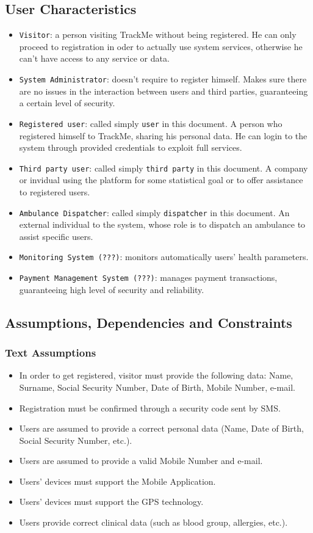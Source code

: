\documentclass[12pt,a4paper]{article}
\begin{document}
		\subsection{User Characteristics}
			\begin{itemize}
				\item \texttt{Visitor}: a person visiting TrackMe without being registered. He can only proceed to registration in oder to actually use system services, otherwise he can't have access to any service or data.
				\item \texttt{System Administrator}: doesn't require to register himself. Makes sure there are no issues in the interaction between users and third parties, guaranteeing a certain level of security.
				\item \texttt{Registered user}: called simply \texttt{user} in this document. A person who registered himself to TrackMe, sharing his personal data. He can login to the system through provided credentials to exploit full services.
				\item \texttt{Third party user}: called simply \texttt{third party} in this document. A company or invidual using the platform for some statistical goal or to offer assistance to registered users.
				\item \texttt{Ambulance Dispatcher}: called simply \texttt{dispatcher} in this document. An external individual to the system, whose role is to dispatch an ambulance to assist specific users.
				\item \texttt{Monitoring System (???)}: monitors automatically users' health parameters.
				\item \texttt{Payment Management System (???)}: manages payment transactions, guaranteeing high level of security and reliability.
			\end{itemize}
		
		\subsection{Assumptions, Dependencies and Constraints}
			\subsubsection{Text Assumptions}
			\begin{itemize}
				\item In order to get registered, visitor must provide the following data: Name, Surname, Social Security Number, Date of Birth, Mobile Number, e-mail.
				\item Registration must be confirmed through a security code sent by SMS.
				\item Users are assumed to provide a correct personal data (Name, Date of Birth, Social Security Number, etc.).
				\item Users are assumed to provide a valid Mobile Number and e-mail.
				\item Users' devices must support the Mobile Application.
				\item Users' devices must support the GPS technology.
				\item Users provide correct clinical data (such as blood group, allergies, etc.).
			\end{itemize}
\end{document}
